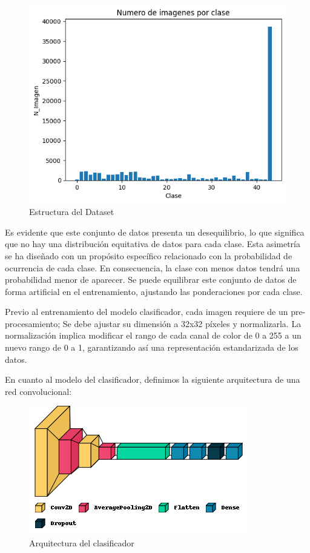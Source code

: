     \begin{figure}[ht]
	    \centering
		\includegraphics[scale=.55]{img/Clases.png}
		\caption{Estructura del Dataset}
	\end{figure}
 
    Es evidente que este conjunto de datos presenta un desequilibrio, lo que significa que no hay una distribución equitativa de datos para cada clase. Esta asimetría se ha diseñado con un propósito específico relacionado con la probabilidad de ocurrencia de cada clase. En consecuencia, la clase con menos datos tendrá una probabilidad menor de aparecer. Se puede equilibrar este conjunto de datos de forma artificial en el entrenamiento, ajustando las ponderaciones por cada clase.

    Previo al entrenamiento del modelo clasificador, cada imagen requiere de un pre-procesamiento; Se debe ajustar su dimensión a 32x32 píxeles y normalizarla. La normalización implica modificar el rango de cada canal de color de 0 a 255 a un nuevo rango de 0 a 1, garantizando así una representación estandarizada de los datos.

    En cuanto al modelo del clasificador, definimos la siguiente arquitectura de una red convolucional:

    \begin{figure}[ht]
	    \centering
		\includegraphics[scale=0.6]{img/GTSRB.png}
		\caption{Arquitectura del clasificador}
	\end{figure}
 
